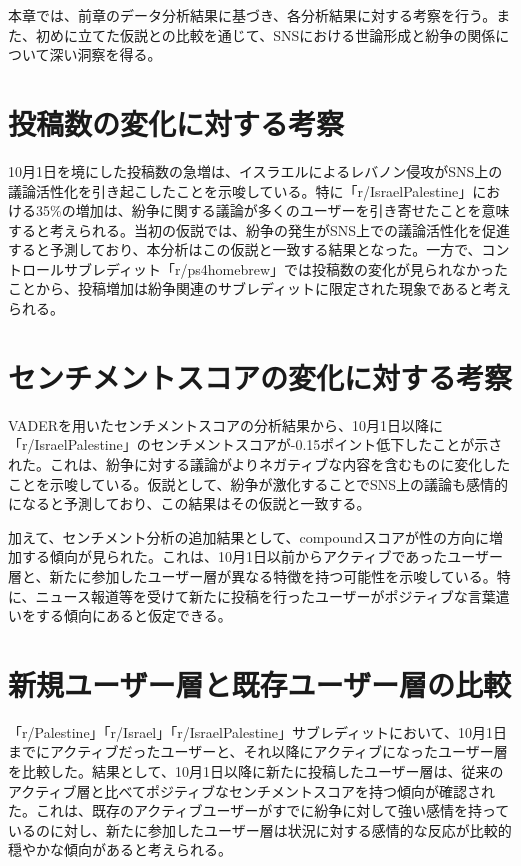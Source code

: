 \documentclass[11pt, a4j]{jreport}
\begin{document}
    本章では、前章のデータ分析結果に基づき、各分析結果に対する考察を行う。また、初めに立てた仮説との比較を通じて、SNSにおける世論形成と紛争の関係について深い洞察を得る。
    
    \section{投稿数の変化に対する考察}
    10月1日を境にした投稿数の急増は、イスラエルによるレバノン侵攻がSNS上の議論活性化を引き起こしたことを示唆している。特に「r/IsraelPalestine」における35\%の増加は、紛争に関する議論が多くのユーザーを引き寄せたことを意味すると考えられる。当初の仮説では、紛争の発生がSNS上での議論活性化を促進すると予測しており、本分析はこの仮説と一致する結果となった。一方で、コントロールサブレディット「r/ps4homebrew」では投稿数の変化が見られなかったことから、投稿増加は紛争関連のサブレディットに限定された現象であると考えられる。
    
    \section{センチメントスコアの変化に対する考察}
    VADERを用いたセンチメントスコアの分析結果から、10月1日以降に「r/IsraelPalestine」のセンチメントスコアが-0.15ポイント低下したことが示された。これは、紛争に対する議論がよりネガティブな内容を含むものに変化したことを示唆している。仮説として、紛争が激化することでSNS上の議論も感情的になると予測しており、この結果はその仮説と一致する。
    
    加えて、センチメント分析の追加結果として、compoundスコアが性の方向に増加する傾向が見られた。これは、10月1日以前からアクティブであったユーザー層と、新たに参加したユーザー層が異なる特徴を持つ可能性を示唆している。特に、ニュース報道等を受けて新たに投稿を行ったユーザーがポジティブな言葉遣いをする傾向にあると仮定できる。
    
    \section{新規ユーザー層と既存ユーザー層の比較}
    「r/Palestine」「r/Israel」「r/IsraelPalestine」サブレディットにおいて、10月1日までにアクティブだったユーザーと、それ以降にアクティブになったユーザー層を比較した。結果として、10月1日以降に新たに投稿したユーザー層は、従来のアクティブ層と比べてポジティブなセンチメントスコアを持つ傾向が確認された。これは、既存のアクティブユーザーがすでに紛争に対して強い感情を持っているのに対し、新たに参加したユーザー層は状況に対する感情的な反応が比較的穏やかな傾向があると考えられる。
    
\end{document}
